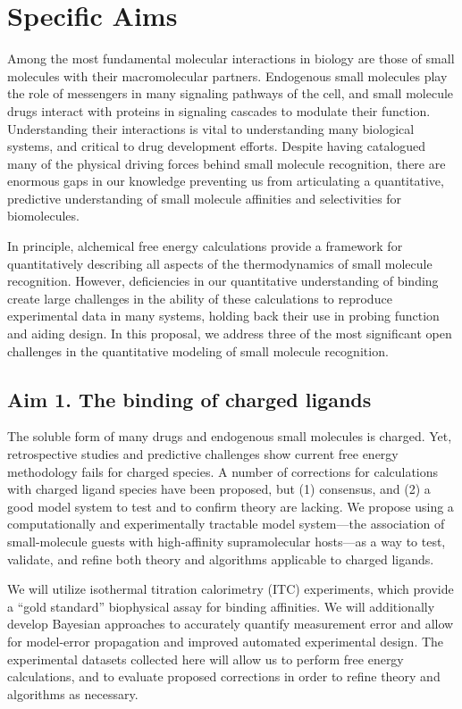 \documentclass[10pt]{article}
\date{}
\begin{document}
\section*{\centering Specific Aims}
Among the most fundamental molecular interactions in biology are those of small molecules with their macromolecular partners.
Endogenous small molecules play the role of messengers in many signaling pathways of the cell, and small molecule drugs interact with proteins in signaling cascades to modulate their function.
Understanding their interactions is vital to understanding many biological systems, and critical to drug development efforts. 
Despite having catalogued many of the physical driving forces behind small molecule recognition, there are enormous gaps in our knowledge preventing us from articulating a quantitative, predictive understanding of small molecule affinities and selectivities for biomolecules.

In principle, alchemical free energy calculations provide a framework for quantitatively describing all aspects of the thermodynamics of small molecule recognition. However, deficiencies in our quantitative understanding of binding create large challenges in the ability of these calculations to reproduce experimental data in many systems, holding back their use in probing function and aiding design.
In this proposal, we address three of the most significant open challenges in the quantitative modeling of small molecule recognition.


\subsection*{Aim 1. The binding of charged ligands}
The soluble form of many drugs and endogenous small molecules is charged. 
Yet, retrospective studies and predictive challenges show current free energy methodology fails for charged species\cite{Rocklin2013b,Muddana2014a}. 
A number of corrections for calculations with charged ligand species have been proposed, but (1) consensus, and (2) a good model system to test and to confirm theory are lacking. 
We propose using a computationally and experimentally tractable model system---the association of small-molecule guests with high-affinity supramolecular hosts---as a way to test, validate, and refine both theory and algorithms applicable to charged ligands.

We will utilize isothermal titration calorimetry (ITC) experiments, which provide a “gold standard” biophysical assay for binding affinities. 
We will additionally develop Bayesian approaches to accurately quantify measurement error and allow for model-error propagation and improved automated experimental design. 
The experimental datasets collected here will allow us to perform free energy calculations, and to evaluate proposed corrections in order to refine theory and algorithms as necessary. 
\end{document}
